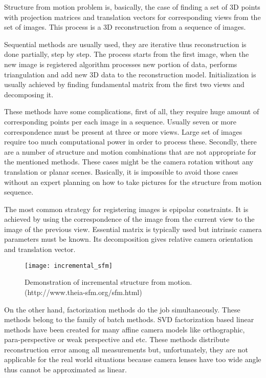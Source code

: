 \documentclass[../../../../main]{subfiles}
\begin{document}
\cite{RichardSzeliski2010}

Structure from motion problem is, basically, the case of finding a set of 3D points with projection matrices and translation vectors for corresponding views from the set of images. This process is a 3D reconstruction from a sequence of images.

Sequential methods are usually used, they are iterative thus reconstruction is done partially, step by step. The process starts from the first image, when the new image is registered algorithm processes new portion of data, performs triangulation and add new 3D data to the reconstruction model. Initialization is usually achieved by finding fundamental matrix from the first two views and decomposing it.

These methods have some complications, first of all, they require huge amount of corresponding points per each image in a sequence. Usually seven or more correspondence must be present at three or more views. Large set of images require too much computational power in order to process these. Secondly, there are a number of structure and motion combinations that are not appropriate for the mentioned methods. These cases might be the camera rotation without any translation or planar scenes. Basically, it is impossible to avoid those cases without an expert planning on how to take pictures for the structure from motion sequence.

The most common strategy for registering images is epipolar constraints. It is achieved by using the correspondence of the image from the current view to the image of the previous view. Essential matrix is typically used but intrinsic camera parameters must be known. Its decomposition gives relative camera orientation and translation vector.

\begin{figure} [ht]
    \begin{center}
        \texttt{[image: incremental\_sfm]}
        \caption{Demonstration of incremental structure from motion. (http://www.theia-sfm.org/sfm.html)}
        \label{fig:incrementalSfm}
    \end{center}
\end{figure}

On the other hand, factorization methods do the job simultaneously. These methods belong to the family of batch methods. \ac{SVD} factorization based linear methods have been created for many affine camera models like orthographic, para-perspective or weak perspective and etc. These methods distribute reconstruction error among all measurements but, unfortunately, they are not applicable for the real world situations because camera lenses have too wide angle thus cannot be approximated as linear.
\end{document}

